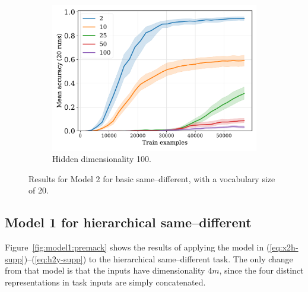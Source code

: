 \documentclass{article}
\newcommand{\Figref}[1]{Figure~\ref{#1}}
\newcommand{\eg}[1]{(\ref{#1})}
\newcommand{\dasheg}[2]{\eg{#1}--\eg{#2}}
\begin{document}
\begin{figure}[H]
  \begin{subfigure}{0.45\linewidth}
    \includegraphics[width=1\textwidth]{./fuzzy-lm-vocab20-pretrain-3tasks-train_size-embed_dim-hidden_dim=100.pdf}
    \caption{Hidden dimensionality 100.}
    \label{fig:model2-rep}
  \end{subfigure}

  \caption{Results for Model 2 for basic same--different, with a vocabulary size of 20.}
  \label{fig:model2}
\end{figure}


\newpage


\subsection{Model 1 for hierarchical same--different}\label{app:model1-premack}

\Figref{fig:model1:premack} shows the results of applying the model in \dasheg{eq:x2h-supp}{eq:h2y-supp} to the hierarchical same--different task. The only change from that model is that the inputs have dimensionality $4m$, since the four distinct representations in task inputs are simply concatenated.
\end{document}
